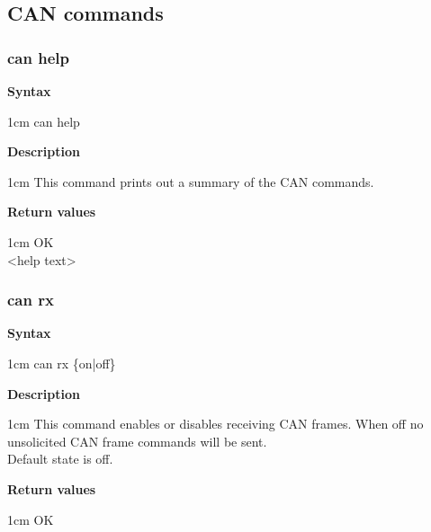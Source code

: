 \documentclass{article}[a4paper]
\begin{document}
\subsection{CAN commands}
\subsubsection{can help}
\begin{tcolorbox}
	{\bf Syntax}

	 1cm \dimexpr\linewidth-2cm\relax
	can help

	\medskip
	{\bf Description}

	 1cm \dimexpr\linewidth-2cm\relax
	This command prints out a summary of the CAN commands.

	\medskip
	{\bf Return values}

	 1cm \dimexpr\linewidth-2cm\relax
	OK \\
	<help text>
\end{tcolorbox}

\subsubsection{can rx}
\begin{tcolorbox}
	{\bf Syntax}

	 1cm \dimexpr\linewidth-2cm\relax
	can rx \{on|off\}

	\medskip
	{\bf Description}

	 1cm \dimexpr\linewidth-2cm\relax
	This command enables or disables receiving CAN frames. When off no unsolicited
	CAN frame commands will be sent. \\
	Default state is off.

	\medskip
	{\bf Return values}

	 1cm \dimexpr\linewidth-2cm\relax
	OK
\end{tcolorbox}
\end{document}
